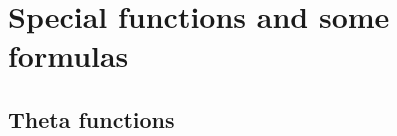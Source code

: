 \begin{comment}
\documentclass[11pt]{article}  %
\usepackage{Common/toshi}

\end{comment}




\section{Special functions and some formulas}





\subsection{Theta functions}

